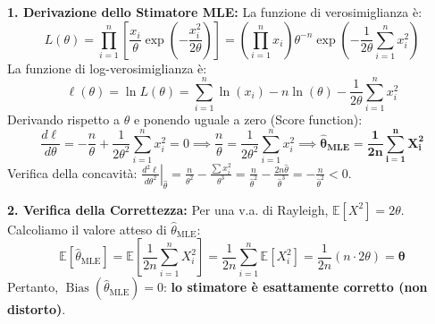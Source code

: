 \begin{dimostrazione}
\textbf{1. Derivazione dello Stimatore MLE:}
La funzione di verosimiglianza è:
\begin{equation*}
    L(\theta) = \prod_{i=1}^n \left[\frac{x_i}{\theta} \exp\left(-\frac{x_i^2}{2\theta}\right)\right] = \left(\prod_{i=1}^n x_i\right) \theta^{-n} \exp\left(-\frac{1}{2\theta} \sum_{i=1}^n x_i^2\right)
\end{equation*}
La funzione di log-verosimiglianza è:
\begin{equation*}
    \ell(\theta) = \ln L(\theta) = \sum_{i=1}^n \ln(x_i) - n \ln(\theta) - \frac{1}{2\theta} \sum_{i=1}^n x_i^2
\end{equation*}
Derivando rispetto a $\theta$ e ponendo uguale a zero (Score function):
\begin{equation*}
    \frac{d\ell}{d\theta} = -\frac{n}{\theta} + \frac{1}{2\theta^2} \sum_{i=1}^n x_i^2 = 0 \implies \frac{n}{\theta} = \frac{1}{2\theta^2} \sum_{i=1}^n x_i^2 \implies \bm{\widehat{\theta}_{\text{MLE}} = \frac{1}{2n} \sum_{i=1}^n X_i^2}
\end{equation*}
Verifica della concavità: $\left.\frac{d^2\ell}{d\theta^2}\right|_{\widehat{\theta}} = \frac{n}{\theta^2} - \frac{\sum x_i^2}{\theta^3} = \frac{n}{\widehat{\theta}^2} - \frac{2n\widehat{\theta}}{\widehat{\theta}^3} = -\frac{n}{\widehat{\theta}^2} < 0$.

\textbf{2. Verifica della Correttezza:}
Per una v.a. di Rayleigh, $\mathbb{E}[X^2] = 2\theta$.
Calcoliamo il valore atteso di $\widehat{\theta}_{\text{MLE}}$:
\begin{equation*}
    \mathbb{E}\left[\widehat{\theta}_{\text{MLE}}\right] = \mathbb{E}\left[\frac{1}{2n} \sum_{i=1}^n X_i^2\right] = \frac{1}{2n} \sum_{i=1}^n \mathbb{E}[X_i^2] = \frac{1}{2n} (n \cdot 2\theta) = \bm{\theta}
\end{equation*}
Pertanto, $\operatorname{Bias}(\widehat{\theta}_{\text{MLE}}) = 0$: \textbf{lo stimatore è esattamente corretto (non distorto)}.


\end{dimostrazione}
